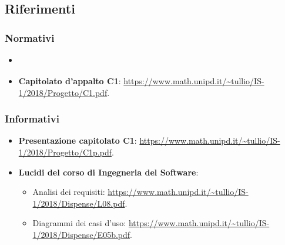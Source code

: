 	\subsection{Riferimenti}

	\subsubsection{Normativi}
	\begin{itemize}
		\item \textbf{\textit{\NdPv}}
		\item \textbf{Capitolato d'appalto C1}: \url{https://www.math.unipd.it/~tullio/IS-1/2018/Progetto/C1.pdf}.
	\end{itemize}

	\subsubsection{Informativi}
	\begin{itemize}
		\item \textbf{Presentazione capitolato C1}: \url{https://www.math.unipd.it/~tullio/IS-1/2018/Progetto/C1p.pdf}.
		\item \textbf{Lucidi del corso di Ingegneria del Software}:
		
		\begin{itemize}
			\item Analisi dei requisiti: \url{https://www.math.unipd.it/~tullio/IS-1/2018/Dispense/L08.pdf}.
			\item Diagrammi dei casi d'uso: \url{https://www.math.unipd.it/~tullio/IS-1/2018/Dispense/E05b.pdf}.
		\end{itemize}
	\end{itemize}